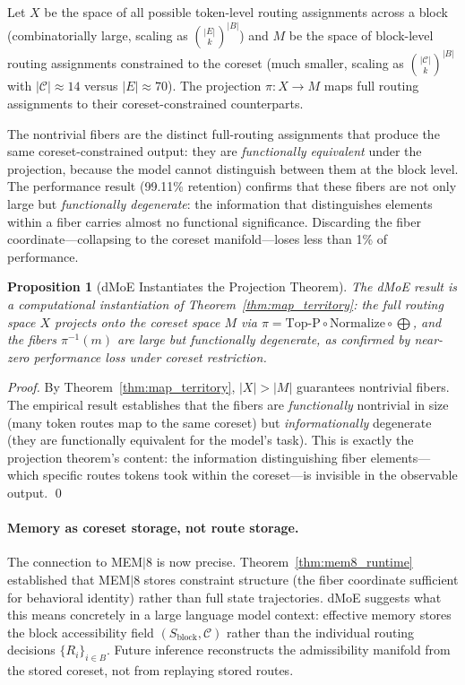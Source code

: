 \documentclass[12pt, a4paper, twoside]{article}
\theoremstyle{plain}
\newtheorem{proposition}[theorem]{Proposition}
\theoremstyle{definition}
\theoremstyle{remark}
\begin{document}
Let $X$ be the space of all possible token-level routing assignments across
a block (combinatorially large, scaling as $\binom{|E|}{k}^{|B|}$) and
$M$ be the space of block-level routing assignments constrained to the
coreset (much smaller, scaling as $\binom{|\mathcal{C}|}{k}^{|B|}$ with
$|\mathcal{C}| \approx 14$ versus $|E| \approx 70$). The projection
$\pi: X \to M$ maps full routing assignments to their coreset-constrained
counterparts.

The nontrivial fibers are the distinct full-routing assignments that produce
the same coreset-constrained output: they are \emph{functionally equivalent}
under the projection, because the model cannot distinguish between them at
the block level. The performance result (99.11\% retention) confirms that
these fibers are not only large but \emph{functionally degenerate}: the
information that distinguishes elements within a fiber carries almost no
functional significance. Discarding the fiber coordinate---collapsing to
the coreset manifold---loses less than 1\% of performance.

\begin{proposition}[dMoE Instantiates the Projection Theorem]
\label{prop:dmoe_projection}
The dMoE result is a computational instantiation of Theorem~\ref{thm:map_territory}:
the full routing space $X$ projects onto the coreset space $M$ via
$\pi = \mathrm{Top\text{-}P} \circ \mathrm{Normalize} \circ \bigoplus$,
and the fibers $\pi^{-1}(m)$ are large but functionally degenerate, as
confirmed by near-zero performance loss under coreset restriction.
\end{proposition}

\begin{proof}
By Theorem~\ref{thm:map_territory}, $|X| > |M|$ guarantees nontrivial fibers.
The empirical result establishes that the fibers are \emph{functionally}
nontrivial in size (many token routes map to the same coreset) but
\emph{informationally} degenerate (they are functionally equivalent for the
model's task). This is exactly the projection theorem's content: the
information distinguishing fiber elements---which specific routes tokens
took within the coreset---is invisible in the observable output. \qed
\end{proof}

\paragraph{Memory as coreset storage, not route storage.}
The connection to MEM$|$8 is now precise. Theorem~\ref{thm:mem8_runtime}
established that MEM$|$8 stores constraint structure (the fiber coordinate
sufficient for behavioral identity) rather than full state trajectories.
dMoE suggests what this means concretely in a large language model context:
effective memory stores the block accessibility field $(S_{\mathrm{block}},
\mathcal{C})$ rather than the individual routing decisions $\{R_i\}_{i \in B}$.
Future inference reconstructs the admissibility manifold from the stored
coreset, not from replaying stored routes.
\end{document}
